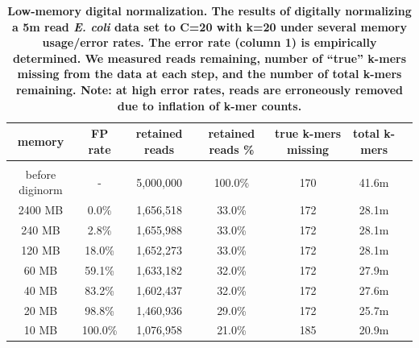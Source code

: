 \documentclass[10pt]{article}
\begin{document}
\begin{table}[!ht]
\caption{
\bf{Low-memory digital normalization. The results of digitally
  normalizing a 5m read {\em E. coli} data set to C=20 with k=20 under
  several memory usage/error rates.  The error rate
  (column 1) is empirically determined.  We measured reads remaining,
  number of ``true'' k-mers missing from the data at each step,
  and the number of total k-mers remaining.  Note: at high
  error rates, reads are erroneously removed due to inflation
  of k-mer counts.}}
\begin{tabular}{ | c | c | c | c | c | c | c |}
memory   & FP rate & retained reads & retained reads \% & true k-mers missing & total k-mers \\
\hline \\
before diginorm   &  -      & 5,000,000   & 100.0\%    & 170  &  41.6m \\
2400 MB           &   0.0\% & 1,656,518   &  33.0\%    & 172  &  28.1m \\
240 MB            &   2.8\% & 1,655,988   &  33.0\%    & 172  &  28.1m \\
120 MB            &  18.0\% & 1,652,273   &  33.0\%    & 172  &  28.1m \\
60 MB             &  59.1\% & 1,633,182   &  32.0\%    & 172  &  27.9m \\
40 MB             &  83.2\% & 1,602,437   &  32.0\%    & 172  &  27.6m \\
20 MB             &  98.8\% & 1,460,936   &  29.0\%    & 172  &  25.7m \\
10 MB             & 100.0\% & 1,076,958   &  21.0\%    & 185  &  20.9m \\
\end{tabular}
\begin{flushleft}
\end{flushleft}
\label{table:loop_norm}
\end{table}

\end{document}
